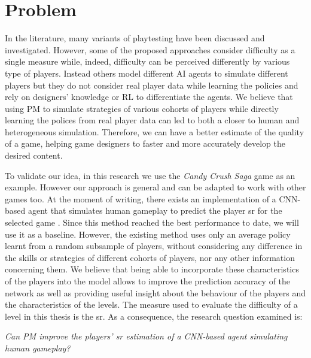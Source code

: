 \section{Problem}
In the literature, many variants of playtesting have been discussed and investigated. However, some of the proposed approaches \cite{eisen_simulating_2017,hoorn_robust_2009,poromaa_crushing_2017,ortega_imitating_2013,hlynur_predicting_2017,purmonen_predicting_2017,chen_game_2017} consider difficulty as a single measure while, indeed, difficulty can be perceived differently by various type of players. Instead others \cite{silva_ai_2017,isaksen_exploring_2015,holmgard_evolving_2014,isaksen_simulating_2017,holmgard_generative_2014} model different AI agents to simulate different players but they do not consider real player data while learning the policies and rely on designers' knowledge or \acs{RL} to differentiate the agents. We believe that using \acl{PM} to simulate strategies of various cohorts of players while directly learning the polices from real player data can led to both a closer to human and heterogeneous simulation. Therefore, we can have a better estimate of the quality of a game, helping game designers to faster and more accurately develop the desired content.

To validate our idea, in this research we use the \textit{Candy Crush Saga} game as an example. However our approach is general and can be adapted to work with other games too.
At the moment of writing, there exists an implementation of a \ac{CNN}-based agent that simulates human gameplay to predict the player \acf{sr} for the selected game \cite{eisen_simulating_2017}. Since this method reached the best performance to date, we will use it as a baseline. However, the existing method uses only an average policy learnt from a random subsample of players, without considering any difference in the skills or strategies of different cohorts of players, nor any other information concerning them. We believe that being able to incorporate these characteristics of the players into the model allows to improve the prediction accuracy of the network as well as providing useful insight about the behaviour of the players and the characteristics of the levels. The measure used to evaluate the difficulty of a level in this thesis is the \acs{sr}. As a consequence, the research question examined is:
\begin{center}
        \textit{ Can \acl{PM} improve the players’ \acs{sr} estimation of a \acs{CNN}-based agent simulating human gameplay?} %
\end{center}
 

